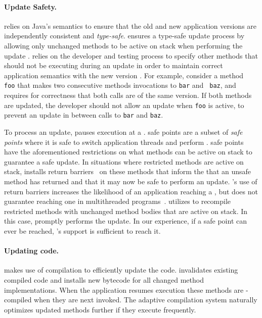 \paragraph{Update Safety.} \JV relies on Java's semantics to ensure that the
old and new application versions are independently consistent and {\em
type-safe}. \JV ensures a type-safe update process by allowing only
unchanged methods to be active on stack when performing the update
\cite{mutatis, neamtiu06dsu, k42usenix}. \JV relies on
the developer and testing process to specify other methods that should not
be executing during an update in
order to maintain correct application semantics with the new version
\cite{gupta-thesis, neamtiu08context}. For example, consider a method {\tt
foo} that makes two consecutive methods invocations to {\tt bar} and {\tt
baz}, and requires for correctness that both calls are of the same version.
If both methods are updated, the developer should not allow an update when
{\tt foo} is active, to prevent an update in between calls to {\tt bar} and
{\tt baz}.

To process an update, \JV pauses
execution at a \DSP.  \USD safe points are a subset of \VM{} {\em safe
points} where it is safe to switch application threads and perform \GC.
\USD safe points have the aforementioned restrictions on what
methods can be active on stack to guarantee a safe update.
%
In situations where restricted methods are active on stack, \JV installs
return barriers~\cite{return-barrier} on these methods that inform the \VM
that an unsafe method has returned and that it may now be safe to perform an update.
\JV's use of return barriers increases the
likelihood of an application reaching a \DSP, but does not guarantee
reaching one in multithreaded programs~\cite{neamtiu09stump}.
\JV utilizes \OSR to recompile restricted methods with unchanged method
bodies that are active on stack. In this case, \JV promptly performs the
update. In our experience, if a safe point can ever be reached, \JV's
support is sufficient to reach it.

\paragraph{Updating code.}
\JV makes use of \JIT compilation to efficiently update the code.
\JV invalidates existing compiled code and installs new
bytecode for all changed method implementations.  When the application
resumes execution these methods are \JIT-compiled when they are next
invoked.  The adaptive compilation system naturally optimizes updated
methods further if they execute frequently.

